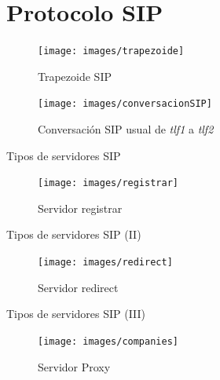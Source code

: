 \documentclass{beamer}
\begin{document}
\appendix





\section*{Protocolo SIP}


\begin{frame}
\begin{figure}
  \centering
  \texttt{[image: images/trapezoide]}
  \caption{Trapezoide SIP}

\end{figure}

\end{frame}

\begin{frame}
  \begin{figure}[!h]
  \centering
 \label{fig:conv-sip} 
 \texttt{[image: images/conversacionSIP]}
  \caption{Conversación SIP usual de \emph{tlf1} a \emph{tlf2}}
\end{figure}
\end{frame}

\begin{frame}{Tipos de servidores SIP}
 
  \begin{figure}[!h]
    \label{fig:sip-registrar}  
    \centering
    \texttt{[image: images/registrar]}
    \caption{Servidor registrar}
  \end{figure}
\end{frame}
\begin{frame}{Tipos de servidores SIP (II)}
  \begin{figure}[!h]
    \centering
    \texttt{[image: images/redirect]}
    \caption{Servidor redirect}
    \label{fig:sip-redirect}
  \end{figure}
\end{frame}
\begin{frame}{Tipos de servidores SIP (III)}
   \begin{figure}[!h]
    \centering
    \texttt{[image: images/companies]}
    \caption{Servidor Proxy}
    \label{fig:sip-redirect}
  \end{figure}
\end{frame}
\end{document}
